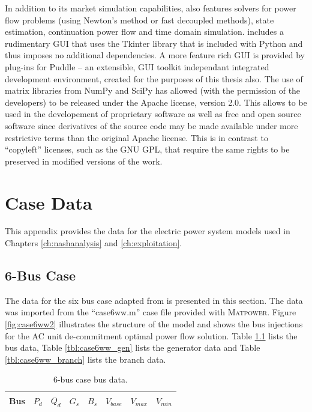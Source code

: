 In addition to its market simulation capabilities, \pylon also features solvers
for power flow problems (using Newton's method or fast decoupled methods),
state estimation, continuation power flow and time domain simulation.  \pylon
includes a rudimentary GUI that uses the Tkinter library that is included
with Python and thus imposes no additional dependencies.  A more feature
rich GUI is provided by plug-ins for Puddle -- an extensible, GUI
toolkit independant integrated development environment, created for the
purposes of this thesis also.  The use of matrix libraries from NumPy and
SciPy has allowed \pylon (with the permission of the \matpower developers) to
be released under the Apache license, version 2.0. This allows \pylon to be
used in the developement of proprietary software as well as free and open
source software since derivatives of the source code may be made available
under more restrictive terms than the original Apache license.  This is in
contrast to ``copyleft'' licenses, such as the GNU GPL, that require the same
rights to be preserved in modified versions of the work.

\chapter{Case Data}
This appendix provides the data for the electric power system models used in
Chapters \ref{ch:nashanalysis} and \ref{ch:exploitation}.

\section{6-Bus Case}
\label{adx:case6ww}
The data for the six bus case adapted from  is presented in this section.  The data was imported from the
``case6ww.m'' case file provided with \textsc{Matpower}.  Figure
\ref{fig:case6ww2} illustrates the structure of the model and shows the bus
injections for the AC unit de-commitment optimal power flow solution.  Table
\ref{tbl:case6ww_bus} lists the bus data, Table \ref{tbl:case6ww_gen} lists
the generator data and Table \ref{tbl:case6ww_branch} lists the branch data.


\begin{table}[h]
\begin{center}
\begin{tabular}{c|c|c|c|c|c|c|c}
\hline
Bus &$P_d$ &$Q_d$ &$G_s$ &$B_s$ &$V_{base}$ &$V_{max}$ &$V_{min}$\\
\hline\hline

\hline
\end{tabular}
\caption{6-bus case bus data.}
\label{tbl:case6ww_bus}
\end{center}
\end{table}

